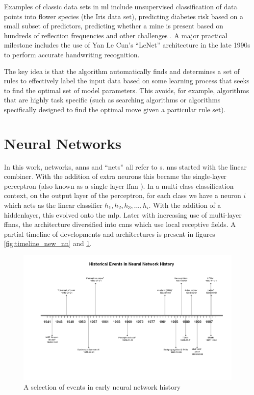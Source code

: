 Examples of classic data sets in \gls{ml} include unsupervised classification of data points into flower species (the Iris data set), predicting diabetes risk based on a small subset of predictors, predicting whether a mine is present based on hundreds of reflection frequencies  and other challenges \cite{uci_ml_data}. A major practical milestone includes the use of Yan Le Cun's \enquote{LeNet} architecture in the late 1990s to perform accurate handwriting recognition. 
\bigskip

The key idea is that the algorithm automatically finds and determines a set of rules to effectively label the input data based on some learning process that seeks to find the optimal set of model parameters. This avoids, for example, algorithms that are highly task specific (such as searching algorithms or algorithms specifically designed to find the optimal move given a particular rule set). 
\bigskip

\section{Neural Networks} 

In this work, networks, \gls{ann}s and \enquote{nets} all refer to s. \gls{nn}s started with the linear combiner. With the addition of extra neurons this became the single-layer perceptron (also known as a single layer \gls{ffnn} \cite{haykin}). In a multi-class classification context, on the output layer of the perceptron, for each class we have a neuron $i$ which acts as the linear classifier $h_1, h_2, h_3, ... , h_i$. With the addition of a \gls{hiddenlayer}, this evolved onto the \gls{mlp}. Later with increasing use of multi-layer \gls{ffnn}s, the architecture diversified into \gls{cnn}s which use local receptive fields. A partial timeline of developments and architectures is present in figures \ref{fig:timeline_new_nn} and \ref{fig:timeline_old_nn}. \bigskip

\begin{figure}
    \centering
    \includegraphics[width=140mm,scale=1.5]{figs/timeline_old_nn.png}
    \caption{A selection of events in early neural network history}
    \label{fig:timeline_old_nn}
\end{figure}

